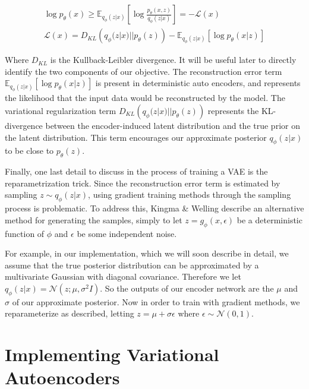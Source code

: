 \documentclass{article} %
\numberwithin{figure}{section}
\renewcommand{\L}{\mathcal{L}}
\begin{document}
\begin{align}
  \log p_\theta(x)\geq \mathbb{E}_{q_\phi(z|x)}\left[\log\frac{p_\theta(x,z)}{q_\phi(z|x)}\right]=-\L(x)\\
  \L(x)=D_{KL}\left(q_\phi(z|x)||p_\theta(z)\right)-\mathbb{E}_{q_\phi(z|x)}\left[\log{p_\theta(x|z)}\right]
  \label{eq:VAEOBJECTIVE}
\end{align}
 
 Where $D_{KL}$ is the Kullback-Leibler divergence. It will be useful later to directly identify the two components of our objective. The reconstruction error term $\mathbb{E}_{q_\phi(z|x)}\left[\log{p_\theta(x|z)}\right]$ is present in deterministic auto encoders, and represents the likelihood that the input data would be reconstructed by the model. The variational regularization term $D_{KL}\left(q_\phi(z|x)||p_\theta(z)\right)$ represents the KL-divergence between the encoder-induced latent distribution and the true prior on the latent distribution. This term encourages our approximate posterior $q_\phi(z|x)$ to be close to $p_\theta(z)$.
\par Finally, one last detail to discuss in the process of training a VAE is the reparametrization trick. Since the reconstruction error term is estimated by sampling $z\sim q_\phi(z|x)$, using gradient training methods through the sampling process is problematic. To address this, Kingma \& Welling describe an alternative method for generating the samples, simply to let $z=g_\phi(x,\epsilon)$ be a deterministic function of $\phi$ and $\epsilon$ be some independent noise.
\par For example, in our implementation, which we will soon describe in detail, we assume that the true posterior distribution can be approximated by a multivariate Gaussian with diagonal covariance. Therefore we let $q_\phi(z|x)=\mathcal{N}(z;\mu,\sigma^2 I)$. So the outputs of our encoder network are the $\mu$ and $\sigma$ of our approximate posterior. Now in order to train with gradient methods, we reparameterize as described, letting $z=\mu + \sigma\epsilon$ where $\epsilon \sim \mathcal{N}(0,1)$.

\section{Implementing Variational Autoencoders}
\end{document}
